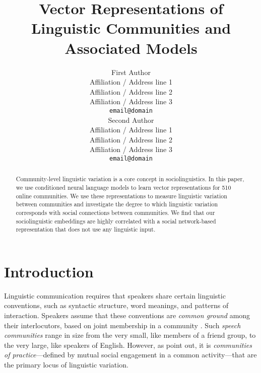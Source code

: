 \documentclass[11pt]{article}
\title{Vector Representations of Linguistic Communities and Associated Models}
\author{First Author \\
  Affiliation / Address line 1 \\
  Affiliation / Address line 2 \\
  Affiliation / Address line 3 \\
  \texttt{email@domain} \\\And
  Second Author \\
  Affiliation / Address line 1 \\
  Affiliation / Address line 2 \\
  Affiliation / Address line 3 \\
  \texttt{email@domain} \\}
\begin{document}
\maketitle
\begin{abstract}
Community-level linguistic variation is a core concept in sociolinguistics. In this paper, we use conditioned neural language models to learn vector representations for 510 online communities. We use these representations to measure linguistic variation between communities and investigate the degree to which linguistic variation corresponds with social connections between communities. We find that our sociolinguistic embeddings are highly correlated with a social network-based representation that does not use any linguistic input.
\end{abstract}








\section{Introduction}

Linguistic communication requires that speakers share
certain linguistic conventions, such as syntactic
structure, word meanings, and patterns of interaction.
Speakers assume that these conventions are \emph{common ground} among
their interlocutors, based on joint membership in a community
\cite{Stalnaker2002, Clark1996}.  Such \emph{speech communities} \citep{Gumperz1972} 
range in size from the very small, like members of a friend group, 
to the very large, like speakers of English. However, as \citet{Eckert1992}
point out, it is \emph{communities of practice}---defined by mutual social engagement
in a common activity---that are the primary locus of linguistic variation.
\end{document}
